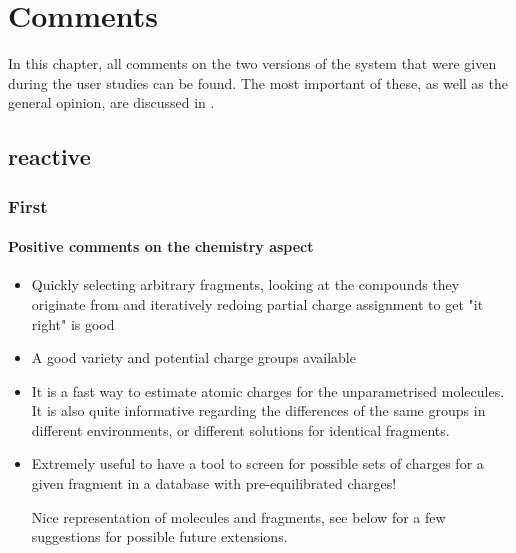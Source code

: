 \chapter{Comments}

In this chapter, all comments on the two versions of the system that were given during the user studies can be found. The most important of these, as well as the general opinion, are discussed in .

\section{\oframp{} reactive}
\subsection{First}
\subsubsection{Positive comments on the chemistry aspect}
\begin{itemize}
\item Quickly selecting arbitrary fragments, looking at the compounds they originate from and iteratively redoing partial charge assignment to get "it right" is good

\item A good variety and potential charge groups available

\item It is a fast way to estimate atomic charges for the unparametrised molecules. It is also quite informative regarding the differences of the same groups in different environments, or different solutions for identical fragments.

\item Extremely useful to have a tool to screen for possible sets of charges for a given fragment in a database with pre-equilibrated charges!

Nice representation of molecules and fragments, see below for a few suggestions for possible future extensions.

\end{itemize}


